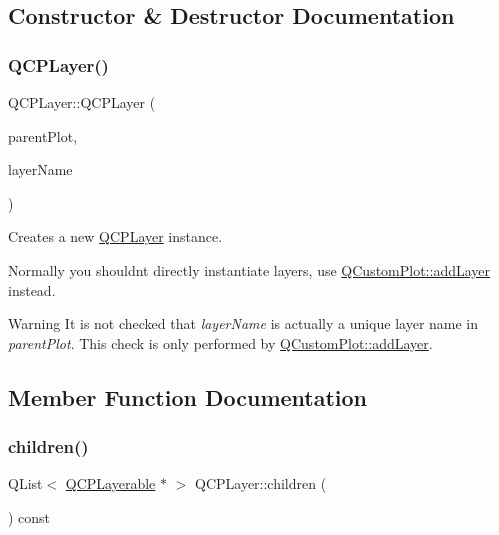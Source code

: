 \subsection{Constructor \& Destructor Documentation}
\mbox{\label{class_q_c_p_layer_a5d0657fc86d624e5efbe930ef21af718}} 
\subsubsection{\texorpdfstring{Q\+C\+P\+Layer()}{QCPLayer()}}
{\footnotesize\ttfamily Q\+C\+P\+Layer\+::\+Q\+C\+P\+Layer (\begin{DoxyParamCaption}\item[{\mbox{\hyperlink{class_q_custom_plot}{Q\+Custom\+Plot}} $\ast$}]{parent\+Plot,  }\item[{const Q\+String \&}]{layer\+Name }\end{DoxyParamCaption})}

Creates a new \mbox{\hyperlink{class_q_c_p_layer}{Q\+C\+P\+Layer}} instance.

Normally you shouldn\textquotesingle{}t directly instantiate layers, use \mbox{\hyperlink{class_q_custom_plot_ad5255393df078448bb6ac83fa5db5f52}{Q\+Custom\+Plot\+::add\+Layer}} instead.

\begin{DoxyWarning}{Warning}
It is not checked that {\itshape layer\+Name} is actually a unique layer name in {\itshape parent\+Plot}. This check is only performed by \mbox{\hyperlink{class_q_custom_plot_ad5255393df078448bb6ac83fa5db5f52}{Q\+Custom\+Plot\+::add\+Layer}}. 
\end{DoxyWarning}


\subsection{Member Function Documentation}
\mbox{\label{class_q_c_p_layer_a183b90941fc78f0b136edd77c5fb6966}} 
\subsubsection{\texorpdfstring{children()}{children()}}
{\footnotesize\ttfamily Q\+List$<$ \mbox{\hyperlink{class_q_c_p_layerable}{Q\+C\+P\+Layerable}} $\ast$ $>$ Q\+C\+P\+Layer\+::children (\begin{DoxyParamCaption}{ }\end{DoxyParamCaption}) const\hspace{0.3cm}{\ttfamily [inline]}}

